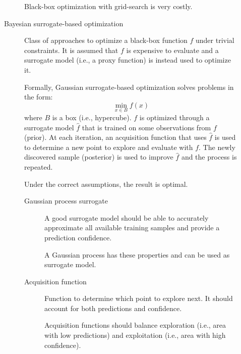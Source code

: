 \begin{description}
\begin{description}
                \begin{remark}
                    Black-box optimization with grid-search is very costly.
                \end{remark}

            \item[Bayesian surrogate-based optimization] 
                Class of approaches to optimize a black-box function $f$ under trivial constraints. It is assumed that $f$ is expensive to evaluate and a surrogate model (i.e., a proxy function) is instead used to optimize it.

                Formally, Gaussian surrogate-based optimization solves problems in the form:
                \[ \min_{x \in B} f(x) \]
                where $B$ is a box (i.e., hypercube). $f$ is optimized through a surrogate model $\hat{f}$ that is trained on some observations from $f$ (prior). At each iteration, an acquisition function that uses $\hat{f}$ is used to determine a new point to explore and evaluate with $f$. The newly discovered sample (posterior) is used to improve $\hat{f}$ and the process is repeated.

                \begin{remark}
                    Under the correct assumptions, the result is optimal.
                \end{remark}

                \begin{description}
                    \item[Gaussian process surrogate]
                        A good surrogate model should be able to accurately approximate all available training samples and provide a prediction confidence.

                        A Gaussian process has these properties and can be used as surrogate model.

                    \item[Acquisition function]
                        Function to determine which point to explore next. It should account for both predictions and confidence.

                        \begin{remark}
                            Acquisition functions should balance exploration (i.e., area with low predictions) and exploitation (i.e., area with high confidence).
                        \end{remark}


\end{description}
\end{description}
\end{description}
